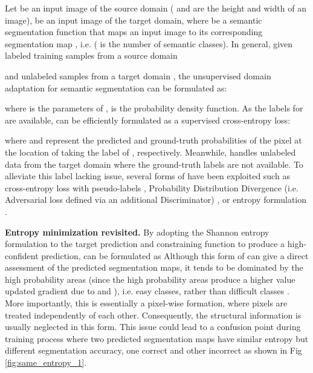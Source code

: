 \documentclass[10pt,twocolumn,letterpaper]{article}
\begin{document}
Let  be an input image of the source domain ( and  are the height and width of an image),   be an input image of the target domain,  where  be a semantic segmentation function 
that maps an input image to its corresponding segmentation map , i.e.  ( is the number of semantic classes). 
In general, given  labeled training samples from a source domain 
 
and  unlabeled samples from a target domain , the 
unsupervised domain adaptation for semantic segmentation can be formulated as: 

where  is the parameters of ,  is the probability density function. As the labels for  are available,  can be efficiently formulated as a supervised cross-entropy loss:

where  and  represent the predicted and ground-truth probabilities of the pixel at the location of   taking the label of  , respectively. 
Meanwhile,  handles unlabeled data from
the target domain where the ground-truth labels are not available. To alleviate this label lacking issue, several forms of  have been exploited such as cross-entropy loss with pseudo-labels \cite{zou2018unsupervised}, Probability Distribution Divergence (i.e. Adversarial loss defined via an additional Discriminator) \cite{tsai2018learning, tsai2019domain}, or entropy formulation \cite{vu2019advent, pan2020unsupervised}.  

\noindent
\textbf{Entropy minimization revisited.}
By adopting the \mbox{Shannon} entropy formulation to the target prediction and constraining function  to produce a high-confident prediction,
 can be formulated as 
Although this form of  can give a direct assessment of the predicted segmentation maps, 
it tends to be dominated 
by the high probability areas (since the high probability areas 
produce a higher value 
updated gradient due to   and ),  i.e. easy classes, rather than difficult classes \cite{vu2019advent}. 
More importantly, this is essentially a pixel-wise formation, where pixels are treated independently of each other.
Consequently, the structural information is usually neglected in this form. This issue could lead to a confusion point during training process where two predicted segmentation maps have similar entropy but different segmentation accuracy, one correct and other incorrect as shown in Fig \ref{fig:same_entropy_1}.
\end{document}
